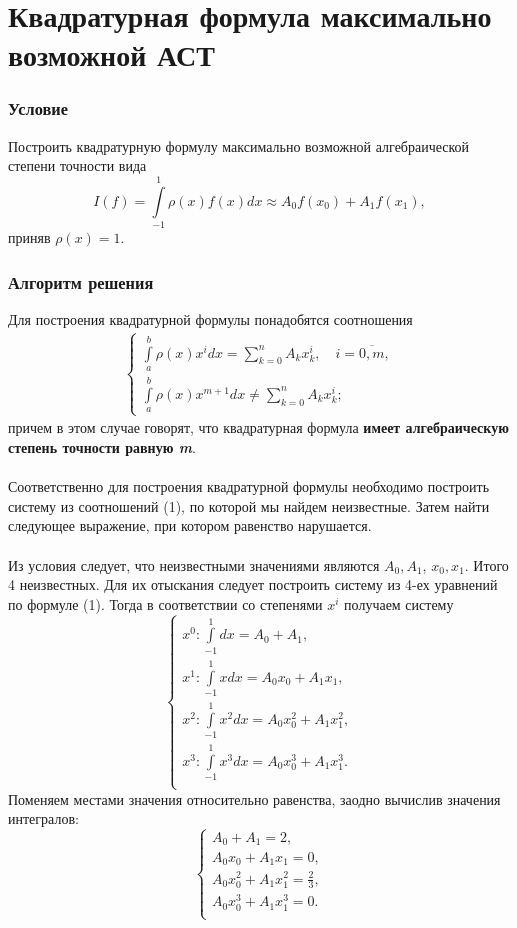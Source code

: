 \documentclass[a4paper, 12pt]{article}
\begin{document}
	\section*{Квадратурная формула максимально возможной АСТ}
	\subsubsection*{Условие}
	Построить квадратурную формулу максимально возможной алгебраической степени точности вида $$I(f) = \int\limits_{-1}^{1}\rho (x) f(x)dx \approx A_0 f(x_0) + A_1 f(x_1),$$
	приняв $\rho(x) = 1$.
	\subsubsection*{Алгоритм решения}
	Для построения квадратурной формулы понадобятся соотношения \begin{eqnarray}
	\begin{cases}
		\int\limits_a^b \rho(x) x^idx = \sum\limits_{k=0}^{n}A_kx^i_k,\quad i=\overline{0,m},\\
		\int\limits_a^b \rho(x) x^{m+1}dx \ne \sum\limits_{k=0}^{n}A_kx^i_k;
	\end{cases}
	\end{eqnarray}
	причем в этом случае говорят, что квадратурная формула \textbf{имеет алгебраическую степень точности равную \textit{m}}.\\\\
	Соответственно для построения квадратурной формулы необходимо построить систему из соотношений (1), по которой мы найдем неизвестные. Затем найти следующее выражение, при котором равенство нарушается.\\\\
	Из условия следует, что неизвестными значениями являются $A_0, A_1$, $x_0, x_1$. Итого 4 неизвестных. Для их отыскания следует построить систему из 4-ех уравнений по формуле (1). Тогда в соответствии со степенями $x^i$ получаем систему $$\begin{cases}
	x^0 : \int\limits_{-1}^1 dx = A_0 + A_1,\\
	x^1 : \int\limits_{-1}^1 xdx = A_0x_0 + A_1x_1,\\
	x^2 : \int\limits_{-1}^1 x^2dx = A_0x_0^2 + A_1x_1^2,\\
	x^3 : \int\limits_{-1}^1 x^3dx = A_0x_0^3 + A_1x_1^3.\\
	\end{cases}$$ 
	Поменяем местами значения относительно равенства, заодно вычислив значения интегралов:
	$$\begin{cases}
	A_0 + A_1 = 2,\\
	A_0x_0 + A_1x_1 = 0,\\
	A_0x_0^2 + A_1x_1^2 = \frac23,\\
	A_0x_0^3 + A_1x_1^3 = 0.\\
	\end{cases}$$ 
\end{document}
